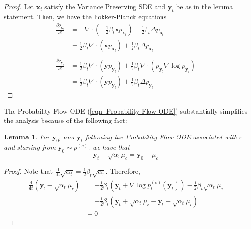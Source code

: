 \documentclass[11pt]{article}
\newcommand{\fitparenth}[1]{\left(#1\right)}
\newcommand{\vect}[1]{\mathbf{#1}}
\theoremstyle{plain}
\newtheorem{lemma}[theorem]{Lemma}
\newcommand{\1}{\mathbbm{1}}
\newcommand{\vx}{\vect{x}}
\newcommand{\pdist}[2][]{p_{#1}^{(#2)}}
\begin{document}
\begin{appendices}
\begin{proof}
    Let $\vx_t$ satisfy the Variance Preserving SDE and $\vect y_t$ be as in the lemma statement. Then, we have the Fokker-Planck equations
    \begin{align*}
        \frac{\partial p_{\vx_t} }{\partial t}&= -\nabla \cdot \fitparenth{-\frac{1}{2}\beta_t \vx p_{\vx_t} } + \frac{1}{2}\beta_t\Delta p_{\vx_t} 
        \\
        &=\frac{1}{2}\beta_t  \nabla \cdot \fitparenth{\vx p_{\vx_t} } + \frac{1}{2}\beta_t\Delta p_{\vx_t} 
        \\
        \\
        \frac{\partial p_{\vect y_t} }{\partial t}
        &= \frac{1}{2}\beta_t \nabla \cdot \fitparenth{\vect y p_{\vect y_t} }  +\frac{1}{2}\beta_t \nabla \cdot \fitparenth{p_{\vect y_t}\nabla \log p_{\vect y_t} } 
        \\
        &= \frac{1}{2}\beta_t \nabla \cdot \fitparenth{\vect y p_{\vect y_t} }  +\frac{1}{2}\beta_t \Delta p_{\vect y_t}
    \end{align*}
\end{proof}

The Probability Flow ODE (\eqref{eqn: Probability Flow ODE}) substantially simplifies the analysis because of the following fact:
\begin{lemma}\label{lemma: simple paths}
    For $\vect y_0$, and $\vect y_t$ following the Probability Flow ODE associated with $c$ and starting from $\vect y_0\sim \pdist{c}$, we have that 
    \[\vect y_t - \sqrt{\alpha_t}\mu_c = \vect y_0 - \mu_c\]
\end{lemma}

\begin{proof}
    Note that $\frac{\mathrm d}{\mathrm d t}\sqrt{\alpha_t}=\frac{1}{2}\beta_t \sqrt{\alpha_t}$. Therefore,
    \begin{align*}
        \frac{\mathrm d}{\mathrm dt}(\vect y_t -\sqrt{\alpha_t}\mu_c) &=-\frac{1}{2}\beta_t \fitparenth{\vect y_t + \nabla \log \pdist[t]{c}(\vect y_t)} - \frac{1}{2}\beta_t \sqrt{\alpha_t} \mu_c
        \\
        &=-\frac{1}{2}\beta_t \fitparenth{\vect y_t + \sqrt{\alpha_t} \mu_c - \vect y_t - \sqrt{\alpha_t} \mu_c}
        \\
        &=0
    \end{align*}
\end{proof}


\end{appendices}
\end{document}
